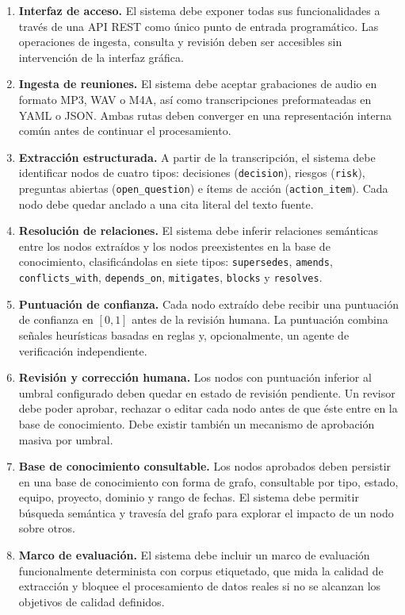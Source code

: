 \begin{enumerate}
  \item \textbf{Interfaz de acceso.} El sistema debe exponer todas sus funcionalidades a través
        de una \ac{API} REST como único punto de entrada programático. Las operaciones de ingesta,
        consulta y revisión deben ser accesibles sin intervención de la interfaz gráfica.

  \item \textbf{Ingesta de reuniones.} El sistema debe aceptar grabaciones de audio en formato
        MP3, WAV o M4A, así como transcripciones preformateadas en YAML o JSON. Ambas rutas deben
        converger en una representación interna común antes de continuar el procesamiento.

  \item \textbf{Extracción estructurada.} A partir de la transcripción, el sistema debe identificar
        nodos de cuatro tipos: decisiones (\texttt{decision}), riesgos (\texttt{risk}), preguntas
        abiertas (\texttt{open\_question}) e ítems de acción (\texttt{action\_item}). Cada nodo
        debe quedar anclado a una cita literal del texto fuente.

  \item \textbf{Resolución de relaciones.} El sistema debe inferir relaciones semánticas entre los
        nodos extraídos y los nodos preexistentes en la base de conocimiento, clasificándolas en
        siete tipos: \texttt{supersedes}, \texttt{amends}, \texttt{conflicts\_with},
        \texttt{depends\_on}, \texttt{mitigates}, \texttt{blocks} y \texttt{resolves}.

  \item \textbf{Puntuación de confianza.} Cada nodo extraído debe recibir una puntuación de
        confianza en $[0, 1]$ antes de la revisión humana. La puntuación combina señales
        heurísticas basadas en reglas y, opcionalmente, un agente de verificación independiente.

  \item \textbf{Revisión y corrección humana.} Los nodos con puntuación inferior al umbral
        configurado deben quedar en estado de revisión pendiente. Un revisor debe poder aprobar,
        rechazar o editar cada nodo antes de que éste entre en la base de conocimiento. Debe
        existir también un mecanismo de aprobación masiva por umbral.

  \item \textbf{Base de conocimiento consultable.} Los nodos aprobados deben persistir en una
        base de conocimiento con forma de grafo, consultable por tipo, estado, equipo, proyecto,
        dominio y rango de fechas. El sistema debe permitir búsqueda semántica y travesía del
        grafo para explorar el impacto de un nodo sobre otros.

  \item \textbf{Marco de evaluación.} El sistema debe incluir un marco de evaluación funcionalmente
        determinista con corpus etiquetado, que mida la calidad de extracción y bloquee el procesamiento
        de datos reales si no se alcanzan los objetivos de calidad definidos.

\end{enumerate}

